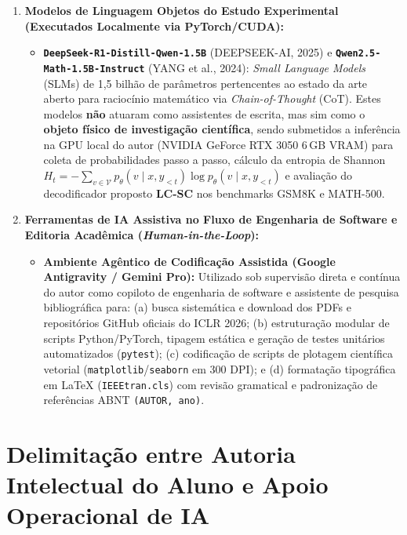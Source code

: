 \documentclass[9pt,a4paper]{extarticle}
\begin{document}
\begin{enumerate}[leftmargin=1.4em, itemsep=1.5pt, topsep=1pt]
    \item \textbf{Modelos de Linguagem Objetos do Estudo Experimental (Executados Localmente via PyTorch/CUDA):}
    \begin{itemize}[leftmargin=1.2em, itemsep=1pt, topsep=0.5pt]
        \item \textbf{\texttt{DeepSeek-R1-Distill-Qwen-1.5B}} (DEEPSEEK-AI, 2025) e \textbf{\texttt{Qwen2.5-Math-1.5B-Instruct}} (YANG et al., 2024): \textit{Small Language Models} (SLMs) de 1,5 bilh\~{a}o de par\^{a}metros pertencentes ao estado da arte aberto para racioc\'{i}nio matem\'{a}tico via \textit{Chain-of-Thought} (CoT). Estes modelos \textbf{n\~{a}o} atuaram como assistentes de escrita, mas sim como o \textbf{objeto f\'{i}sico de investiga\c{c}\~{a}o cient\'{i}fica}, sendo submetidos a infer\^{e}ncia na GPU local do autor (NVIDIA GeForce RTX 3050 6\,GB VRAM) para coleta de probabilidades passo a passo, c\'{a}lculo da entropia de Shannon $H_t = -\sum_{v \in \mathcal{V}} p_\theta(v \mid x, y_{<t})\log p_\theta(v \mid x, y_{<t})$ e avalia\c{c}\~{a}o do decodificador proposto \textbf{LC-SC} nos benchmarks GSM8K e MATH-500.
    \end{itemize}
    \item \textbf{Ferramentas de IA Assistiva no Fluxo de Engenharia de Software e Editoria Acad\^{e}mica (\textit{Human-in-the-Loop}):}
    \begin{itemize}[leftmargin=1.2em, itemsep=1pt, topsep=0.5pt]
        \item \textbf{Ambiente Ag\^{e}ntico de Codifica\c{c}\~{a}o Assistida (Google Antigravity / Gemini Pro):} Utilizado sob supervis\~{a}o direta e cont\'{i}nua do autor como copiloto de engenharia de software e assistente de pesquisa bibliogr\'{a}fica para: (a) busca sistem\'{a}tica e download dos PDFs e reposit\'{o}rios GitHub oficiais do ICLR 2026; (b) estrutura\c{c}\~{a}o modular de scripts Python/PyTorch, tipagem est\'{a}tica e gera\c{c}\~{a}o de testes unit\'{a}rios automatizados (\texttt{pytest}); (c) codifica\c{c}\~{a}o de scripts de plotagem cient\'{i}fica vetorial (\texttt{matplotlib}/\texttt{seaborn} em 300 DPI); e (d) formata\c{c}\~{a}o tipogr\'{a}fica em LaTeX (\texttt{IEEEtran.cls}) com revis\~{a}o gramatical e padroniza\c{c}\~{a}o de refer\^{e}ncias ABNT \texttt{(AUTOR, ano)}.
    \end{itemize}
\end{enumerate}

\section{Delimita\c{c}\~{a}o entre Autoria Intelectual do Aluno e Apoio Operacional de IA}
\end{document}
